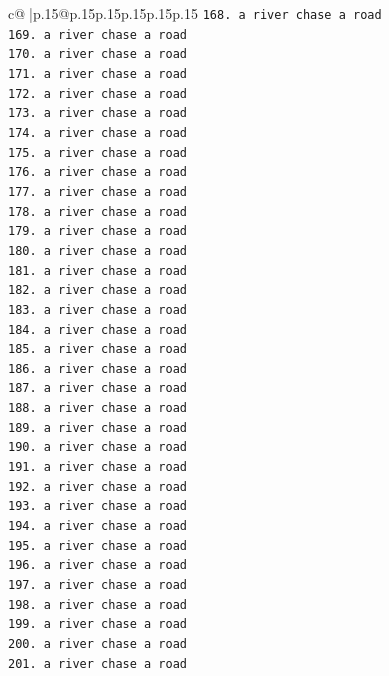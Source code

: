 \documentclass{article}
\begin{document}
{\begin{supertabular}{c@{$\;$}|p{.15\linewidth}@{}p{.15\linewidth}p{.15\linewidth}p{.15\linewidth}p{.15\linewidth}p{.15\linewidth}}
{{{\texttt{168. a river chase a road} \\
\texttt{169. a river chase a road} \\
\texttt{170. a river chase a road} \\
\texttt{171. a river chase a road} \\
\texttt{172. a river chase a road} \\
\texttt{173. a river chase a road} \\
\texttt{174. a river chase a road} \\
\texttt{175. a river chase a road} \\
\texttt{176. a river chase a road} \\
\texttt{177. a river chase a road} \\
\texttt{178. a river chase a road} \\
\texttt{179. a river chase a road} \\
\texttt{180. a river chase a road} \\
\texttt{181. a river chase a road} \\
\texttt{182. a river chase a road} \\
\texttt{183. a river chase a road} \\
\texttt{184. a river chase a road} \\
\texttt{185. a river chase a road} \\
\texttt{186. a river chase a road} \\
\texttt{187. a river chase a road} \\
\texttt{188. a river chase a road} \\
\texttt{189. a river chase a road} \\
\texttt{190. a river chase a road} \\
\texttt{191. a river chase a road} \\
\texttt{192. a river chase a road} \\
\texttt{193. a river chase a road} \\
\texttt{194. a river chase a road} \\
\texttt{195. a river chase a road} \\
\texttt{196. a river chase a road} \\
\texttt{197. a river chase a road} \\
\texttt{198. a river chase a road} \\
\texttt{199. a river chase a road} \\
\texttt{200. a river chase a road} \\
\texttt{201. a river chase a road} \\
}}}
\end{supertabular}}
\end{document}
